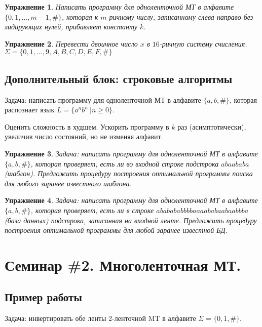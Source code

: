 \documentclass[a4paper, 12pt]{extarticle}
\newtheorem*{homework}{Упражнение}
\begin{document}
\begin{homework}
Написать программу для одноленточной МТ в алфавите $\{0, 1, ..., m - 1, \#\}$, которая к $m$-ричному числу, 
записанному слева направо без лидирующих нулей, прибавляет константу $k$.
\end{homework}

\begin{homework}
Перевести двоичное число $x$ в $16$-ричную систему счисления. $\Sigma = \{0, 1, ..., 9, A, B, C, D, E, F, \#\}$
\end{homework}

\subsection*{Дополнительный блок: строковые алгоритмы}
Задача: написать программу для одноленточной МТ в алфавите $\{a, b, \#\}$, которая распознает язык $L = \{a^nb^n \ | n \geq 0\}$.

Оценить сложность в худшем. Ускорить программу в $k$ раз (асимптотически), увеличив число состояний, но не изменяя алфавит.

\begin{homework}
Задача: написать программу для одноленточной МТ в алфавите $\{a, b, \#\}$, которая проверяет,
есть ли во входной строке подстрока $abaababa$ (\textit{шаблон}). Предложить процедуру построения 
оптимальной программы поиска для любого заранее известного шаблона.
\end{homework}

\begin{homework}
Задача: написать программу для одноленточной МТ в алфавите $\{a, b, \#\}$, которая проверяет,
есть ли в строке $ababababbbbaaaababaabaabbba$ (\textit{база данных}) подстрока, записанная на входной ленте. 
Предложить процедуру построения оптимальной программы для любой заранее известной БД.
\end{homework}

\newpage
\section*{Семинар \#2. Многоленточная МТ.}

\subsection*{Пример работы}

Задача: инвертировать обе ленты 2-ленточной MT в алфавите $\Sigma = \{0, 1, \#\}$.
\end{document}
